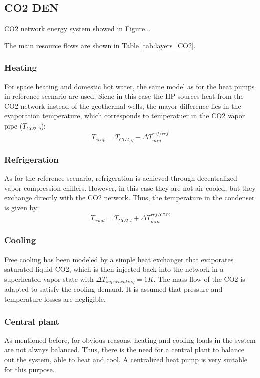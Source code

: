 \documentclass{article}
\begin{document}
\subsection{CO2 DEN}
CO2 network energy system showed in Figure...

The main resource flows are shown in Table \ref{tab:layers_CO2}.


\subsubsection{Heating}
For space heating and domestic hot water, the same model as for the heat pumps in reference scenario are used. Sicne in this case the HP sources heat from the CO2 network instead of the geothermal wells, the mayor difference lies in the evaporation temperature, which corresponds to temperatuer in the CO2 vapor pipe ($T_{CO2,g}$):
\begin{equation}
    T_{evap} = T_{CO2,g} - \Delta T_{min}^{ref/ref}
\end{equation}

\subsubsection{Refrigeration}
As for the reference scenario, refrigeration is achieved through decentralized vapor compression chillers. However, in this case they are not air cooled, but they exchange directly with the CO2 network. Thus, the temperature in the condenser is given by:
\begin{equation}
    T_{cond} = T_{CO2,l} + \Delta T_{min}^{ref/CO2}
\end{equation}

\subsubsection{Cooling}
Free cooling has been modeled by a simple heat exchanger that evaporates saturated liquid CO2, which is then injected back into the network in a superheated vapor state with $\Delta T_{superheating} = 1K$. The mass flow of the CO2 is adapted to satisfy the cooling demand. It is assumed that pressure and temperature losses are negligible.

\subsubsection{Central plant}
As mentioned before, for obvious reasons, heating and cooling loads in the system are not always balanced. Thus, there is the need for a central plant to balance out the system, able to heat and cool. A centralized heat pump is very suitable for this purpose.
\end{document}
